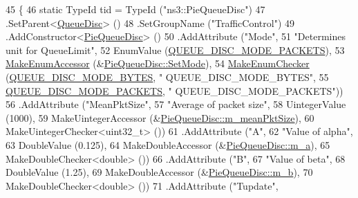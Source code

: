 \begin{DoxyCode}
45 \{
46   \textcolor{keyword}{static} TypeId tid = TypeId (\textcolor{stringliteral}{"ns3::PieQueueDisc"})
47     .SetParent<\hyperlink{classns3_1_1QueueDisc_a0e328ad3196b7d16783b8680722381d6}{QueueDisc}> ()
48     .SetGroupName (\textcolor{stringliteral}{"TrafficControl"})
49     .AddConstructor<\hyperlink{classns3_1_1PieQueueDisc_ad960f4cf2fd0d2c6e25e05c4cbb12ef8}{PieQueueDisc}> ()
50     .AddAttribute (\textcolor{stringliteral}{"Mode"},
51                    \textcolor{stringliteral}{"Determines unit for QueueLimit"},
52                    EnumValue (\hyperlink{classns3_1_1PieQueueDisc_af026730ff1c04dd9bdf74b1797ae2ac4af556e8533dede431ff4553fe631883dc}{QUEUE\_DISC\_MODE\_PACKETS}),
53                    \hyperlink{namespacens3_af5050739867ce63896dec011e332c8ec}{MakeEnumAccessor} (&\hyperlink{classns3_1_1PieQueueDisc_acdd70eff41af17390496084a87627045}{PieQueueDisc::SetMode}),
54                    \hyperlink{namespacens3_a48832781a2b521d3d0091e05ece30615}{MakeEnumChecker} (\hyperlink{classns3_1_1PieQueueDisc_af026730ff1c04dd9bdf74b1797ae2ac4a7912e4d0abe5d772d04d327880734539}{QUEUE\_DISC\_MODE\_BYTES}, \textcolor{stringliteral}{"
      QUEUE\_DISC\_MODE\_BYTES"},
55                                     \hyperlink{classns3_1_1PieQueueDisc_af026730ff1c04dd9bdf74b1797ae2ac4af556e8533dede431ff4553fe631883dc}{QUEUE\_DISC\_MODE\_PACKETS}, \textcolor{stringliteral}{"
      QUEUE\_DISC\_MODE\_PACKETS"}))
56     .AddAttribute (\textcolor{stringliteral}{"MeanPktSize"},
57                    \textcolor{stringliteral}{"Average of packet size"},
58                    UintegerValue (1000),
59                    MakeUintegerAccessor (&\hyperlink{classns3_1_1PieQueueDisc_a02068aca097b0bd7aba59f734ed5571e}{PieQueueDisc::m\_meanPktSize}),
60                    MakeUintegerChecker<uint32\_t> ())
61     .AddAttribute (\textcolor{stringliteral}{"A"},
62                    \textcolor{stringliteral}{"Value of alpha"},
63                    DoubleValue (0.125),
64                    MakeDoubleAccessor (&\hyperlink{classns3_1_1PieQueueDisc_aa7302b5d199b328f69ddfdb00858ff98}{PieQueueDisc::m\_a}),
65                    MakeDoubleChecker<double> ())
66     .AddAttribute (\textcolor{stringliteral}{"B"},
67                    \textcolor{stringliteral}{"Value of beta"},
68                    DoubleValue (1.25),
69                    MakeDoubleAccessor (&\hyperlink{classns3_1_1PieQueueDisc_aebef26b64ae9bb0f1f151820f9621ce1}{PieQueueDisc::m\_b}),
70                    MakeDoubleChecker<double> ())
71     .AddAttribute (\textcolor{stringliteral}{"Tupdate"},

\end{DoxyCode}
